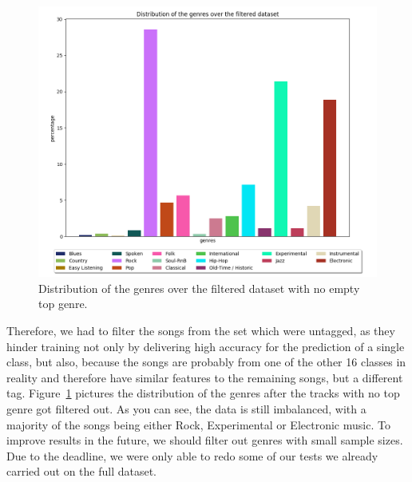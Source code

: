 \begin{figure}[]
	\centering
	\includegraphics[width=1.0\textwidth]{images/genredistfiltered.png}
	\caption{Distribution of the genres over the filtered dataset with no empty
	top genre.}	
	\label{filtered}
\end{figure}

Therefore, we had to filter the songs from the set which were untagged,
as they hinder training not only by delivering high accuracy for the
prediction of a single class, but also, because the songs are probably
from one of the other 16 classes in reality and therefore have similar
features to the remaining songs, but a different tag.
Figure~\ref{filtered} pictures the distribution of the genres after the
tracks with no top genre got filtered out. As you can see, the data is
still imbalanced, with a majority of the songs being either Rock,
Experimental or Electronic music. To improve results in the future, we
should filter out genres with small sample sizes. Due to the deadline,
we were only able to redo some of our tests we already carried out on
the full dataset.